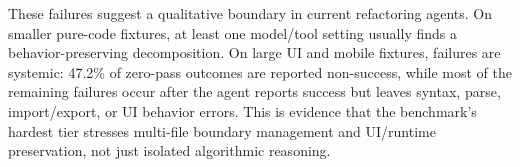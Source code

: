 \documentclass[11pt,letterpaper]{article}
\begin{document}
\begin{table}[ht]
\centering
\caption{Composition of the zero-pass fixture tier. Failure counts are aggregated across all failed outcomes in the tier; each zero-pass fixture contributes 14 failed outcomes. Categories are heuristic labels inferred from target paths and file contents.}
\label{tab:zero-pass-tier}
\small
\setlength{\tabcolsep}{4pt}
\end{table}

\noindent These failures suggest a qualitative boundary in current refactoring agents. On smaller pure-code fixtures, at least one model/tool setting usually finds a behavior-preserving decomposition. On large UI and mobile fixtures, failures are systemic: 47.2\% of zero-pass outcomes are reported non-success, while most of the remaining failures occur after the agent reports success but leaves syntax, parse, import/export, or UI behavior errors. This is evidence that the benchmark's hardest tier stresses multi-file boundary management and UI/runtime preservation, not just isolated algorithmic reasoning.
\end{document}
